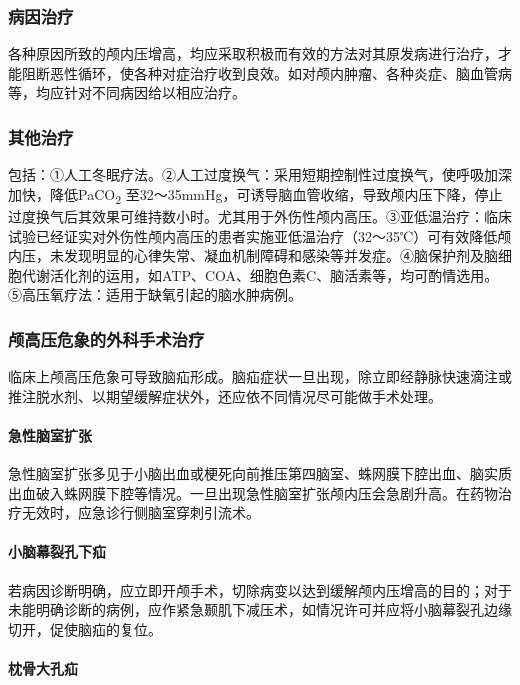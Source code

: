 \subsubsection{病因治疗}

各种原因所致的颅内压增高，均应采取积极而有效的方法对其原发病进行治疗，才能阻断恶性循环，使各种对症治疗收到良效。如对颅内肿瘤、各种炎症、脑血管病等，均应针对不同病因给以相应治疗。

\subsubsection{其他治疗}

包括：①人工冬眠疗法。②人工过度换气：采用短期控制性过度换气，使呼吸加深加快，降低PaCO\textsubscript{2}
至32～35mmHg，可诱导脑血管收缩，导致颅内压下降，停止过度换气后其效果可维持数小时。尤其用于外伤性颅内高压。③亚低温治疗：临床试验已经证实对外伤性颅内高压的患者实施亚低温治疗（32～35℃）可有效降低颅内压，未发现明显的心律失常、凝血机制障碍和感染等并发症。④脑保护剂及脑细胞代谢活化剂的运用，如ATP、COA、细胞色素C、脑活素等，均可酌情选用。⑤高压氧疗法：适用于缺氧引起的脑水肿病例。

\subsubsection{颅高压危象的外科手术治疗}

临床上颅高压危象可导致脑疝形成。脑疝症状一旦出现，除立即经静脉快速滴注或推注脱水剂、以期望缓解症状外，还应依不同情况尽可能做手术处理。

\paragraph{急性脑室扩张}

急性脑室扩张多见于小脑出血或梗死向前推压第四脑室、蛛网膜下腔出血、脑实质出血破入蛛网膜下腔等情况。一旦出现急性脑室扩张颅内压会急剧升高。在药物治疗无效时，应急诊行侧脑室穿刺引流术。

\paragraph{小脑幕裂孔下疝}

若病因诊断明确，应立即开颅手术，切除病变以达到缓解颅内压增高的目的；对于未能明确诊断的病例，应作紧急颞肌下减压术，如情况许可并应将小脑幕裂孔边缘切开，促使脑疝的复位。

\paragraph{枕骨大孔疝}

